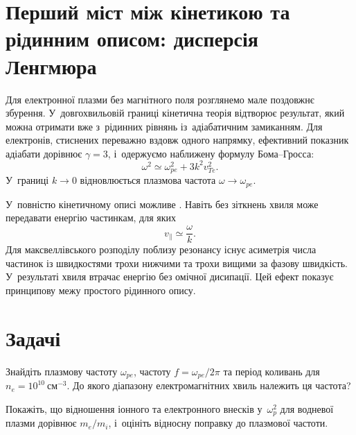 \section{Перший міст між кінетикою та рідинним описом: дисперсія Ленгмюра}



Для електронної плазми без магнітного поля розглянемо мале поздовжнє збурення.
У~довгохвильовій границі кінетична теорія відтворює результат, який можна отримати вже
з~рідинних рівнянь із~адіабатичним замиканням. Для електронів, стиснених переважно вздовж
одного напрямку, ефективний показник адіабати дорівнює $\gamma=3$, і~одержуємо наближену
формулу Бома--Гросса:
\begin{equation}\label{eq:bohm-gross}
\omega^2\simeq\omega_{pe}^2+3k^2v_{Te}^2.
\end{equation}
У~границі $k\to0$ відновлюється плазмова частота $\omega\to\omega_{pe}$.

У~повністю кінетичному описі можливе . Навіть без зіткнень хвиля
може передавати енергію частинкам, для яких
\begin{equation*}
v_\parallel\simeq\frac{\omega}{k}.
\end{equation*}
Для максвеллівського розподілу поблизу резонансу існує асиметрія числа частинок із
швидкостями трохи нижчими та трохи вищими за фазову швидкість. У~результаті хвиля втрачає
енергію без омічної дисипації. Цей ефект показує принципову межу простого рідинного опису.





\section*{Задачі}

\begin{problem}\label{prb:PlasmaFrequency}
	Знайдіть плазмову частоту $\omega_{pe}$, частоту $f=\omega_{pe}/2\pi$ та період
	коливань для $n_e=10^{10}~\mathrm{см}^{-3}$. До якого діапазону електромагнітних хвиль
	належить ця частота?
\end{problem}

\begin{problem}\label{prb:PlasmaIons}
	Покажіть, що відношення іонного та електронного внесків у~$\omega_p^2$ для водневої
	плазми дорівнює $m_e/m_i$, і~оцініть відносну поправку до плазмової частоти.
\end{problem}

